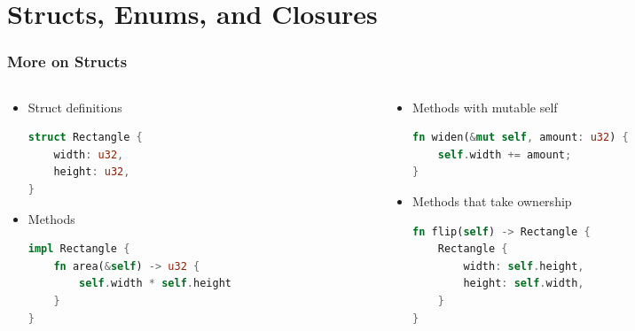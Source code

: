  \section{Structs, Enums, and Closures}

\begin{frame}[fragile]
    \frametitle{More on Structs}

    \begin{columns}
    \begin{column}{0.5\textwidth}

    \begin{itemize}
        \item<1-> Struct definitions
        \begin{lstlisting}[language=rust]
struct Rectangle {
    width: u32,
    height: u32,
}
        \end{lstlisting}

        \item<2-> Methods
        \begin{lstlisting}[language=rust]
impl Rectangle {
    fn area(&self) -> u32 {
        self.width * self.height
    }
}
        \end{lstlisting}
    \end{itemize}

    \end{column}
    \begin{column}{0.5\textwidth}

    \begin{itemize}
        \item<3-> Methods with mutable self
        \begin{lstlisting}[language=rust]
fn widen(&mut self, amount: u32) {
    self.width += amount;
}
        \end{lstlisting}

        \item<4-> Methods that take ownership
        \begin{lstlisting}[language=rust]
fn flip(self) -> Rectangle {
    Rectangle {
        width: self.height,
        height: self.width,
    }
}
        \end{lstlisting}
    \end{itemize}

    \end{column}
    \end{columns}
\end{frame}

